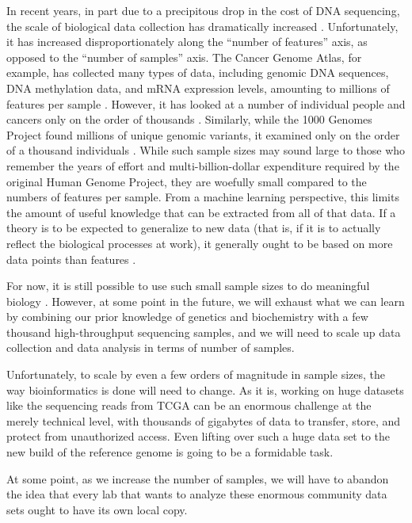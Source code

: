 \documentclass[11pt,proposal]{ucthesis}
\begin{document}
In recent years, in part due to a precipitous drop in the cost of DNA sequencing, the scale of biological data collection has dramatically increased \cite{wetterstrand2014dna}. Unfortunately, it has increased disproportionately along the ``number of features'' axis, as opposed to the ``number of samples'' axis. The Cancer Genome Atlas, for example, has collected many types of data, including genomic DNA sequences, DNA methylation data, and mRNA expression levels, amounting to millions of features per sample \cite{tcga2014sample}. However, it has looked at a number of individual people and cancers only on the order of thousands \cite{tcga2014sample}. Similarly, while the 1000 Genomes Project found millions of unique genomic variants, it examined only on the order of a thousand individuals \cite{10002010map}. While such sample sizes may sound large to those who remember the years of effort and multi-billion-dollar expenditure required by the original Human Genome Project, they are woefully small compared to the numbers of features per sample. From a machine learning perspective, this limits the amount of useful knowledge that can be extracted from all of that data. If a theory is to be expected to generalize to new data (that is, if it is to actually reflect the biological processes at work), it generally ought to be based on more data points than features \cite{hua2005optimal}.

For now, it is still possible to use such small sample sizes to do meaningful biology \cite{weinstein2013cancer}. However, at some point in the future, we will exhaust what we can learn by combining our prior knowledge of genetics and biochemistry with a few thousand high-throughput sequencing samples, and we will need to scale up data collection and data analysis in terms of number of samples.

Unfortunately, to scale by even a few orders of magnitude in sample sizes, the way bioinformatics is done will need to change. As it is, working on huge datasets like the sequencing reads from TCGA can be an enormous challenge at the merely technical level, with thousands of gigabytes of data to transfer, store, and protect from unauthorized access. Even lifting over such a huge data set to the new build of the reference genome is going to be a formidable task.

At some point, as we increase the number of samples, we will have to abandon the idea that every lab that wants to analyze these enormous community data sets ought to have its own local copy.
\end{document}
